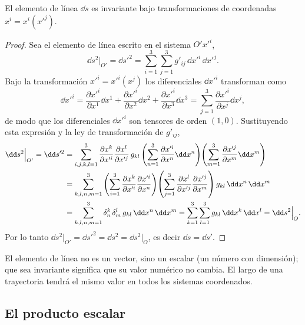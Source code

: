 \begin{proposicion}
El elemento de línea $\dd s$ es invariante bajo transformaciones de coordenadas $x^i=x^i(x'^j)$.
\end{proposicion}

\begin{proof}
Sea el elemento de línea escrito en el sistema $O'x'^i$,
\begin{equation}
\dd s^2\Big|_{O'} = \dd s'^2 = \sum_{i=1}^3\sum_{j=1}^3 g'_{ij}\,\dd x'^i\,\dd x'^j .
\end{equation}
Bajo la transformación $x'^i=x'^i(x^j)$ los diferenciales $\dd x'^i$ transforman como
\begin{equation}
\dd x'^i = \frac{\partial x'^i}{\partial x^1}\dd x^1 + \frac{\partial x'^i}{\partial x^2}\dd x^2 + \frac{\partial x'^i}{\partial x^3}\dd x^3
= \sum_{j=1}^3 \frac{\partial x'^i}{\partial x^j}\dd x^j ,
\end{equation}
de modo que los diferenciales $\dd x'^i$ son tensores de orden $(1,0)$. Sustituyendo esta expresión y la ley de transformación de $g'_{ij}$,
\begin{align}
\dd s^2\Big|_{O'} = \dd s'^2
&= \sum_{i,j,k,l=1}^3 \frac{\partial x^k}{\partial x'^i}\frac{\partial x^l}{\partial x'^j}\, g_{kl}
\left(\sum_{n=1}^3 \frac{\partial x'^i}{\partial x^n}\dd x^n\right)\!\left(\sum_{m=1}^3 \frac{\partial x'^j}{\partial x^m}\dd x^m\right) \notag \\
&= \sum_{k,l,n,m=1}^3\left(\sum_{i=1}^3\frac{\partial x^k}{\partial x'^i}\frac{\partial x'^i}{\partial x^n}\right)\!\left(\sum_{j=1}^3\frac{\partial x^l}{\partial x'^j}\frac{\partial x'^j}{\partial x^m}\right) g_{kl}\,\dd x^n\,\dd x^m \notag\\
&= \sum_{k,l,n,m=1}^3 \delta^k_n\,\delta^l_m\, g_{kl}\,\dd x^n\,\dd x^m
= \sum_{k=1}^3\sum_{l=1}^3 g_{kl}\,\dd x^k\,\dd x^l = \dd s^2\Big|_O .
\end{align}
Por lo tanto $\dd s^2\big|_{O'} = \dd s'^2 = \dd s^2 = \dd s^2\big|_O$, es decir $\dd s = \dd s'$.
\end{proof}

\begin{observacion}
El elemento de línea no es un vector, sino un escalar (un número con dimensión); que sea invariante significa que su valor numérico no cambia. El largo de una trayectoria tendrá el mismo valor en todos los sistemas coordenados.
\end{observacion}

\subsection{El producto escalar}

